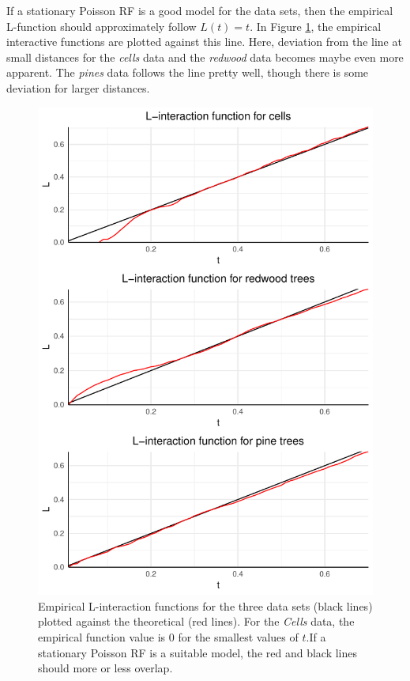If a stationary Poisson RF is a good model for the data sets, then the empirical L-function should approximately follow $L(t) = t$. In Figure \ref{fig:L_emp_theor}, the empirical interactive functions are plotted against this line. Here, deviation from the line at small distances for the \textit{cells} data and the \textit{redwood} data becomes maybe even more apparent. The \textit{pines} data follows the line pretty well, though there is some deviation for larger distances. 

\begin{figure}
    \centering
    \includegraphics[scale=0.95]{figures/prob1_L_emp_theor.pdf}
    \caption{Empirical L-interaction functions for the three data sets (black lines) plotted against the theoretical (red lines). For the \textit{Cells} data, the empirical function value is $0$ for the smallest values of $t$.If a stationary Poisson RF is a suitable model, the red and black lines should more or less overlap.}
    \label{fig:L_emp_theor}
\end{figure}

